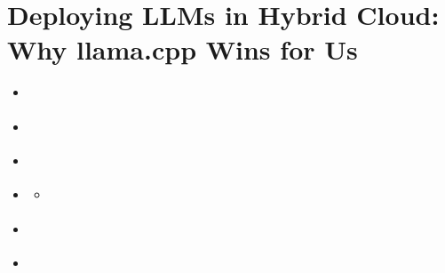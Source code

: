 \documentclass[letterpaper,10pt,english]{sphinxmanual}
\begin{document}
\chapter{Deploying LLMs in Hybrid Cloud: Why llama.cpp Wins for Us}
\label{\detokenize{hybrid:deploying-llms-in-hybrid-cloud-why-llama-cpp-wins-for-us}}\label{\detokenize{hybrid::doc}}
\begin{sphinxcontents}
\begin{itemize}
\item {} 
\sphinxAtStartPar
{}\label{\detokenize{hybrid:id5}}{\hyperref[\detokenize{hybrid:current-setup-ollama-in-testing}]{}}

\item {} 
\sphinxAtStartPar
{}\label{\detokenize{hybrid:id6}}{\hyperref[\detokenize{hybrid:production-requirements-hybrid-cloud-multi-user-access}]{}}

\item {} 
\sphinxAtStartPar
{}\label{\detokenize{hybrid:id7}}{\hyperref[\detokenize{hybrid:evaluation-vllm-vs-llama-cpp}]{}}

\item {} 
\sphinxAtStartPar
{}\label{\detokenize{hybrid:id8}}{\hyperref[\detokenize{hybrid:why-llama-cpp-is-our-production-choice}]{}}
\begin{itemize}
\item {} 
\sphinxAtStartPar
{}\label{\detokenize{hybrid:id9}}{\hyperref[\detokenize{hybrid:example-production-ready-server}]{}}

\end{itemize}

\item {} 
\sphinxAtStartPar
{}\label{\detokenize{hybrid:id10}}{\hyperref[\detokenize{hybrid:migration-path-from-ollama-llama-cpp}]{}}

\item {} 
\sphinxAtStartPar
{}\label{\detokenize{hybrid:id11}}{\hyperref[\detokenize{hybrid:summary}]{}}

\end{itemize}
\end{sphinxcontents}
\end{document}
